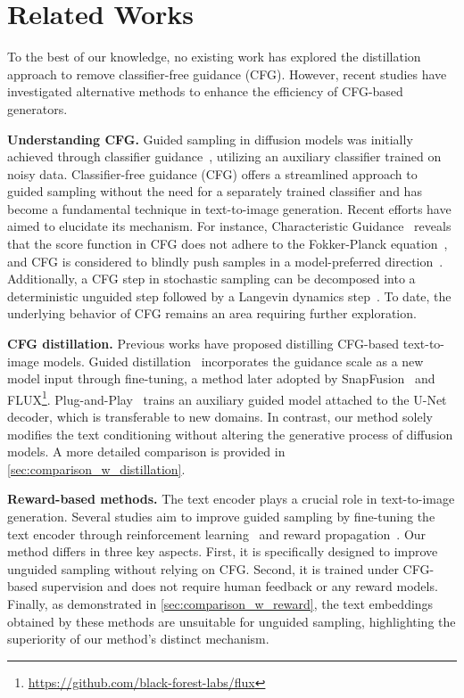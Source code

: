 \section{Related Works}
\label{related}

To the best of our knowledge, no existing work has explored the distillation approach to remove classifier-free guidance (CFG). However, recent studies have investigated alternative methods to enhance the efficiency of CFG-based generators.

\textbf{Understanding CFG.} Guided sampling in diffusion models was initially achieved through classifier guidance~\cite{dhariwal2021diffusion}, utilizing an auxiliary classifier trained on noisy data. Classifier-free guidance (CFG)\cite{ho2022classifier} offers a streamlined approach to guided sampling without the need for a separately trained classifier and has become a fundamental technique in text-to-image generation\cite{rombach2022ldm}. Recent efforts have aimed to elucidate its mechanism. For instance, Characteristic Guidance~\cite{zheng2024characteristic} reveals that the score function in CFG does not adhere to the Fokker-Planck equation~\cite{lai2023fp}, and CFG is considered to blindly push samples in a model-preferred direction~\cite{karras2024guiding}. Additionally, a CFG step in stochastic sampling can be decomposed into a deterministic unguided step followed by a Langevin dynamics step~\cite{bradley2024classifier}. To date, the underlying behavior of CFG remains an area requiring further exploration.

\textbf{CFG distillation.} 
Previous works have proposed distilling CFG-based text-to-image models. Guided distillation~\cite{meng2023distillation} incorporates the guidance scale as a new model input through fine-tuning, a method later adopted by SnapFusion~\cite{li2024snapfusion} and FLUX\footnote{\url{https://github.com/black-forest-labs/flux}}. Plug-and-Play~\cite{hsiao2024plug} trains an auxiliary guided model attached to the U-Net decoder, which is transferable to new domains. In contrast, our method solely modifies the text conditioning without altering the generative process of diffusion models. A more detailed comparison is provided in \cref{sec:comparison_w_distillation}.

\textbf{Reward-based methods.} The text encoder plays a crucial role in text-to-image generation. Several studies aim to improve guided sampling by fine-tuning the text encoder through reinforcement learning~\cite{chen2025enhancing} and reward propagation~\cite{li2024textcraftor}. Our method differs in three key aspects. First, it is specifically designed to improve unguided sampling without relying on CFG. Second, it is trained under CFG-based supervision and does not require human feedback or any reward models. Finally, as demonstrated in \cref{sec:comparison_w_reward}, the text embeddings obtained by these methods are unsuitable for unguided sampling, highlighting the superiority of our method's distinct mechanism.
